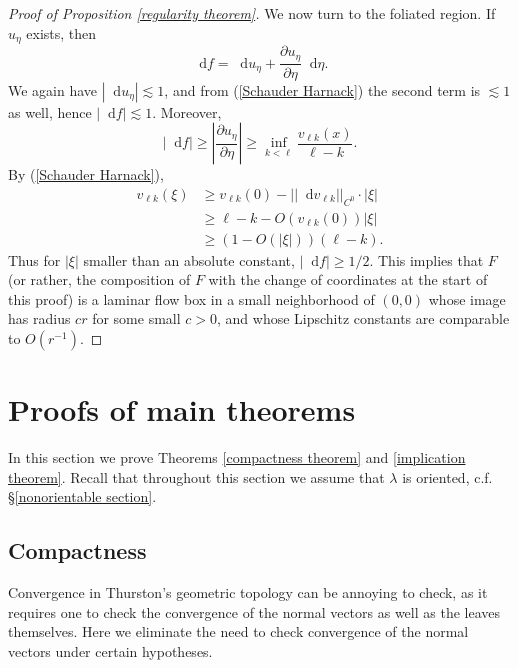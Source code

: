 \documentclass[reqno,11pt]{amsart}
\newcommand*\dif{\mathop{}\!\mathrm{d}}
\theoremstyle{definition}
\numberwithin{equation}{section}
\begin{document}
\begin{proof}[Proof of Proposition \ref{regularity theorem}]
We now turn to the foliated region. If $u_\eta$ exists, then
$$\dif f = \dif u_\eta + \frac{\partial u_\eta}{\partial \eta} \dif \eta.$$
We again have $|\dif u_\eta| \lesssim 1$, and from (\ref{Schauder Harnack}) the second term is $\lesssim 1$ as well, hence $|\dif f| \lesssim 1$.
Moreover,
$$|\dif f| \geq \left|\frac{\partial u_\eta}{\partial \eta}\right| \geq \inf_{k < \ell} \frac{v_{\ell k}(x)}{\ell - k}.$$
By (\ref{Schauder Harnack}),
\begin{align*}
	v_{\ell k}(\xi) &\geq v_{\ell k}(0) - ||\dif v_{\ell k}||_{C^0} \cdot |\xi| \\
	&\geq \ell - k - O(v_{\ell k}(0)) |\xi| \\
	&\geq (1 - O(|\xi|)) (\ell - k).
\end{align*}
Thus for $|\xi|$ smaller than an absolute constant, $|\dif f| \geq 1/2$.
This implies that $F$ (or rather, the composition of $F$ with the change of coordinates at the start of this proof) is a laminar flow box in a small neighborhood of $(0, 0)$ whose image has radius $cr$ for some small $c > 0$, and whose Lipschitz constants are comparable to $O(r^{-1})$.
\end{proof}

\section{Proofs of main theorems}\label{CompactnessSec}
In this section we prove Theorems \ref{compactness theorem} and \ref{implication theorem}.
Recall that throughout this section we assume that $\lambda$ is oriented, c.f. \S\ref{nonorientable section}.

\subsection{Compactness}
Convergence in Thurston's geometric topology can be annoying to check, as it requires one to check the convergence of the normal vectors as well as the leaves themselves.
Here we eliminate the need to check convergence of the normal vectors under certain hypotheses.
\end{document}
